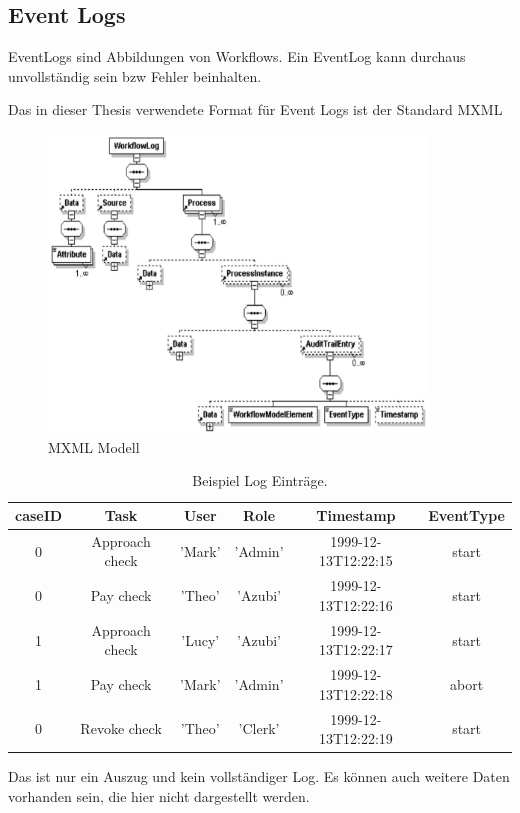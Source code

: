 \subsection{Event Logs}

EventLogs sind Abbildungen von Workflows. Ein EventLog kann durchaus unvollständig sein bzw Fehler beinhalten.

Das in dieser Thesis verwendete Format für Event Logs ist der Standard MXML

\begin{figure}[ht]
	\centering
  \includegraphics[width=0.9\textwidth]{"Figures/mxml"}
	\caption{MXML Modell}
	\label{fig:mxml}
\end{figure}


\begin{table}[h]
  \centering
  \begin{tabular}{|c|c|c|c|c|c|}
  caseID & Task & User & Role & Timestamp & EventType\\
  \hline
  0 & Approach check &'Mark' &'Admin' &1999-12-13T12:22:15 & start\\
  0 & Pay check & 'Theo' &'Azubi' &1999-12-13T12:22:16 & start\\
  1 & Approach check &'Lucy' & 'Azubi' &1999-12-13T12:22:17 &start\\
  1 & Pay check &'Mark' & 'Admin' &1999-12-13T12:22:18 & abort\\
  0 & Revoke check & 'Theo' & 'Clerk' & 1999-12-13T12:22:19 & start
  \end{tabular}
Das ist nur ein Auszug und kein vollständiger Log. Es können auch weitere Daten vorhanden sein, die hier nicht dargestellt werden.
  \caption{Beispiel Log Einträge. }
  \label{tab:examplelog}
\end{table}


